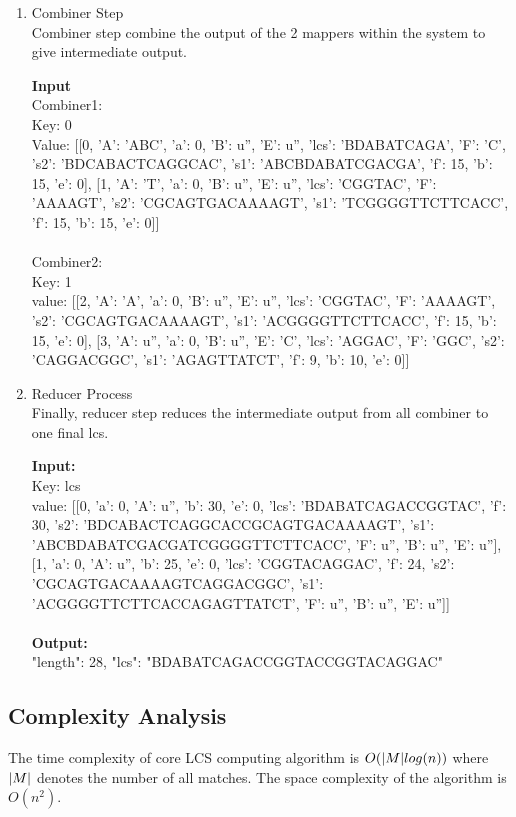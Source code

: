 \documentclass[journal,twoside]{IEEEtran}
\begin{document}
\begin{enumerate}
\item Combiner Step\\
Combiner step combine the output of the 2 mappers within the system to give intermediate output.

\textbf{Input}\\
Combiner1: \\
Key: 0  \\
Value: [[0, {'A': 'ABC', 'a': 0, 'B': u'', 'E': u'', 'lcs': 'BDABATCAGA', 'F': 'C', 's2': 'BDCABACTCAGGCAC', 's1': 'ABCBDABATCGACGA', 'f': 15, 'b': 15, 'e': 0}], [1, {'A': 'T', 'a': 0, 'B': u'', 'E': u'', 'lcs': 'CGGTAC', 'F': 'AAAAGT', 's2': 'CGCAGTGACAAAAGT', 's1': 'TCGGGGTTCTTCACC', 'f': 15, 'b': 15, 'e': 0}]]\\ \\
Combiner2: \\
Key: 1  \\
value:  [[2, {'A': 'A', 'a': 0, 'B': u'', 'E': u'', 'lcs': 'CGGTAC', 'F': 'AAAAGT', 's2': 'CGCAGTGACAAAAGT', 's1': 'ACGGGGTTCTTCACC', 'f': 15, 'b': 15, 'e': 0}], [3, {'A': u'', 'a': 0, 'B': u'', 'E': 'C', 'lcs': 'AGGAC', 'F': 'GGC', 's2': 'CAGGACGGC', 's1': 'AGAGTTATCT', 'f': 9, 'b': 10, 'e': 0}]]\\

\item Reducer Process\\
Finally, reducer step reduces the intermediate output from all combiner to one final lcs. 

\textbf{Input:}\\
Key:  lcs  \\
value:  [[0, {'a': 0, 'A': u'', 'b': 30, 'e': 0, 'lcs': 'BDABATCAGACCGGTAC', 'f': 30, 's2': 'BDCABACTCAGGCACCGCAGTGACAAAAGT', 's1': 'ABCBDABATCGACGATCGGGGTTCTTCACC', 'F': u'', 'B': u'', 'E': u''}], [1, {'a': 0, 'A': u'', 'b': 25, 'e': 0, 'lcs': 'CGGTACAGGAC', 'f': 24, 's2': 'CGCAGTGACAAAAGTCAGGACGGC', 's1': 'ACGGGGTTCTTCACCAGAGTTATCT', 'F': u'', 'B': u'', 'E': u''}]]\\ \\
\textbf{Output:}\\
{"length": 28, "lcs": "BDABATCAGACCGGTACCGGTACAGGAC"}\\
\end{enumerate}


\subsection{Complexity Analysis}
The time complexity of core LCS computing algorithm is $O(\text{\textbar} M\text{\textbar} log(n))$ where $\text{\textbar}M\text{\textbar}$ denotes the number of all matches. The space complexity of the algorithm is $O(n^2)$.
\\
\end{document}

